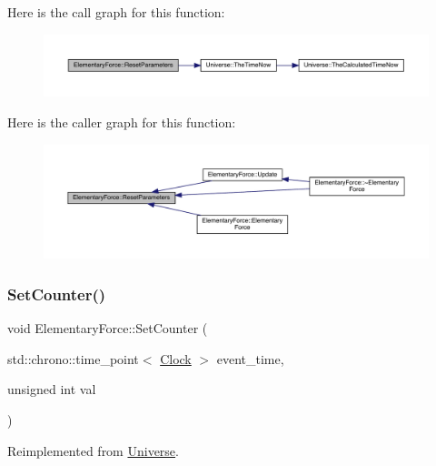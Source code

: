 Here is the call graph for this function\+:
\nopagebreak
\begin{figure}[H]
\begin{center}
\leavevmode
\includegraphics[width=350pt]{class_elementary_force_a1dedcd23a538b87f71ecd43cb36a6db5_cgraph}
\end{center}
\end{figure}
Here is the caller graph for this function\+:
\nopagebreak
\begin{figure}[H]
\begin{center}
\leavevmode
\includegraphics[width=350pt]{class_elementary_force_a1dedcd23a538b87f71ecd43cb36a6db5_icgraph}
\end{center}
\end{figure}
\mbox{\label{class_elementary_force_a3762cf66ed266b310446417215dec3fa}} 
\subsubsection{\texorpdfstring{Set\+Counter()}{SetCounter()}}
{\footnotesize\ttfamily void Elementary\+Force\+::\+Set\+Counter (\begin{DoxyParamCaption}\item[{std\+::chrono\+::time\+\_\+point$<$ \hyperlink{universe_8h_a0ef8d951d1ca5ab3cfaf7ab4c7a6fd80}{Clock} $>$}]{event\+\_\+time,  }\item[{unsigned int}]{val }\end{DoxyParamCaption})\hspace{0.3cm}{\ttfamily [virtual]}}



Reimplemented from \hyperlink{class_universe_aa22202ae740eb1355529afcb13285e91}{Universe}.



